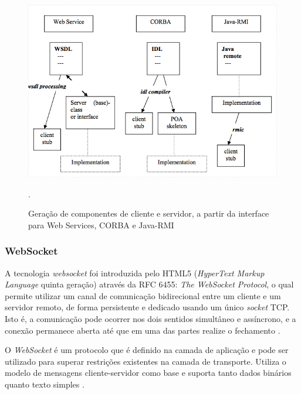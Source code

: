 \documentclass[
	12pt,				%
	oneside,			%
	a4paper,			%
	english,			%
	brazil				%
	]{abntex2ppgsi}
\begin{document}

\begin{figure}[h!]
	\centering
	\includegraphics[width=0.8\columnwidth]{images/estrutura_comunicacao.png}
	\caption{Geração de componentes de cliente e servidor, a partir da interface para Web Services, CORBA e Java-RMI \cite{gray2004comparison}}.
	\label{fig:estrutura_comunicacao}
\end{figure}


\subsubsection{WebSocket}

A tecnologia \textit{websocket} foi introduzida pelo HTML5 (\textit{HyperText Markup Language} quinta geração) através da RFC 6455: \textit{The WebSocket Protocol}, o qual permite utilizar um canal de comunicação bidirecional entre um cliente e um servidor remoto, de forma persistente e dedicado usando um único \textit{socket} TCP. Isto é, a comunicação pode ocorrer nos dois sentidos simultâneo e assíncrono, e a conexão permanece aberta até que em uma das partes realize o fechamento \cite{melnikov2011websocket}.

O \textit{WebSocket} é um protocolo que é definido na camada de aplicação e pode ser utilizado para superar restrições existentes na camada de transporte. Utiliza o modelo de mensagens cliente-servidor como base e suporta tanto dados binários quanto texto simples \cite{themudo2014implementaccao}.
\end{document}
